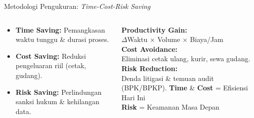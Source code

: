 \documentclass[aspectratio=169,11pt]{beamer}
\begin{document}
\begin{frame}{Metodologi Pengukuran: \textit{Time-Cost-Risk Saving}}
    \vspace{0.2cm}
    \begin{columns}[T]
        \begin{premiumbox}
            \scriptsize
            \begin{itemize}
                \item \textcolor{plnblue}{\textbf{Time Saving:}} Pemangkasan waktu tunggu \& durasi proses.
                \item \textcolor{plnorange}{\textbf{Cost Saving:}} Reduksi pengeluaran riil (cetak, gudang).
                \item \textcolor{plngreen}{\textbf{Risk Saving:}} Perlindungan sanksi hukum \& kehilangan data.
            \end{itemize}
        \end{premiumbox}
        
        \begin{orangebox}
            \tiny
            \textbf{Productivity Gain:}\\
            $\Delta$Waktu $\times$ Volume $\times$ Biaya/Jam\\[0.1cm]
            \textbf{Cost Avoidance:}\\
            Eliminasi cetak ulang, kurir, sewa gudang.\\[0.1cm]
            \textbf{Risk Reduction:}\\
            Denda litigasi \& temuan audit (BPK/BPKP).
            \vfill
            \textbf{Time} \& \textbf{Cost} = Efisiensi Hari Ini\\
            \textbf{Risk} = Keamanan Masa Depan
        \end{orangebox}
    \end{columns}
\end{frame}
\end{document}
